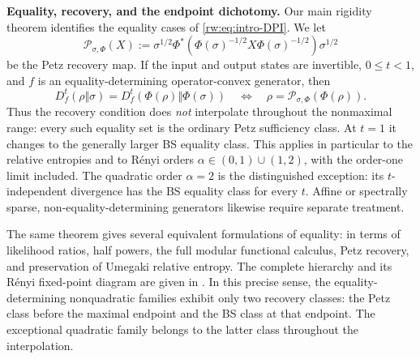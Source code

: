 \documentclass[11pt]{article}
\theoremstyle{remark}
\newcommand{\1}{\mathbbm{1}}
\begin{document}
\medskip
\noindent\textbf{Equality, recovery, and the endpoint dichotomy.}
Our main rigidity theorem identifies the equality cases of
\eqref{rw:eq:intro-DPI}.  We let
\begin{equation*}
 \mathcal P_{\sigma,\Phi}(X)
 :=\sigma^{1/2}\Phi^*\!\left(
   \Phi(\sigma)^{-1/2}X\Phi(\sigma)^{-1/2}
  \right)\sigma^{1/2}
\end{equation*}
be the Petz recovery map.  If the input and output states are
invertible, $0\leq t<1$, and $f$ is an equality-determining
operator-convex generator, then
\begin{equation}
 \boxed{
 D_f^t(\rho\Vert\sigma)
 =D_f^t\!\left(\Phi(\rho)\Vert\Phi(\sigma)\right)
 \quad\Longleftrightarrow\quad
 \rho=\mathcal P_{\sigma,\Phi}(\Phi(\rho)).}
 \label{rw:eq:intro-Petz-rigidity}
\end{equation}
Thus the recovery condition does \emph{not} interpolate throughout
the nonmaximal range: every such equality set is the ordinary Petz
sufficiency class.  At $t=1$ it changes to the generally larger BS
equality class.  This applies in particular to the relative entropies
and to R\'enyi orders $\alpha\in(0,1)\cup(1,2)$, with the order-one
limit included.  The quadratic order $\alpha=2$ is the distinguished
exception: its $t$-independent divergence has the BS equality class
for every $t$.  Affine or spectrally sparse, non-equality-determining
generators likewise require separate treatment.

The same theorem gives several equivalent formulations of equality:
in terms of likelihood ratios, half powers, the full modular
functional calculus, Petz recovery, and preservation of Umegaki
relative entropy.  The complete hierarchy and its R\'enyi
fixed-point diagram are given in
.  In this precise sense,
the equality-determining nonquadratic families exhibit only two
recovery classes: the Petz class before the maximal endpoint and the
BS class at that endpoint.  The exceptional quadratic family belongs
to the latter class throughout the interpolation.
\end{document}
